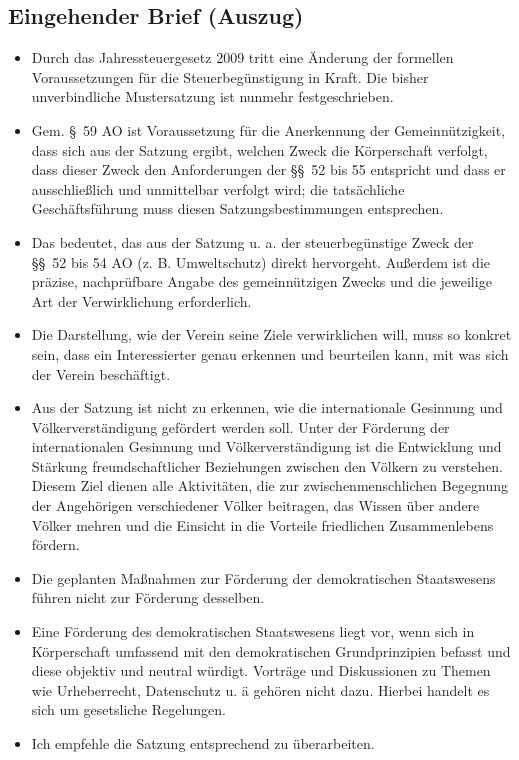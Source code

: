 \documentclass[10pt,a4paper]{scrartcl}
\newcommand{\qs}[1]{\glqq#1\grqq}
\begin{document}
\subsection*{Eingehender Brief (Auszug)}
    \begin{itemize}
        \item \qs{	Durch das Jahressteuergesetz 2009 tritt eine {\"A}nderung der formellen
					Voraussetzungen f{\"u}r die Steuerbeg{\"u}nstigung in Kraft. Die bisher
					unverbindliche Mustersatzung ist nunmehr festgeschrieben.}
		\item \qs{	Gem. \S\ 59 AO ist Voraussetzung f{\"u}r die Anerkennung der Gemeinn{\"u}tzigkeit,
					dass sich aus der Satzung ergibt, welchen Zweck die K{\"o}rperschaft
					verfolgt, dass dieser Zweck den Anforderungen der \S\S\ 52 bis 55
					entspricht und dass er ausschlie{\ss}lich und unmittelbar verfolgt wird; die
					tats{\"a}chliche Gesch{\"a}ftsf{\"u}hrung muss diesen Satzungsbestimmungen
					entsprechen.}
		\item \qs{	Das bedeutet, das aus der Satzung u. a. der steuerbeg{\"u}nstige Zweck der
					\S\S\ 52 bis 54 AO (z. B. Umweltschutz) direkt hervorgeht. Au{\ss}erdem ist die
					pr{\"a}zise, nachpr{\"u}fbare Angabe des gemeinn{\"u}tzigen Zwecks und die jeweilige
					Art der Verwirklichung erforderlich.}
		\item \qs{	Die Darstellung, wie der Verein seine Ziele verwirklichen will, muss so
					konkret sein, dass ein Interessierter genau erkennen und beurteilen
					kann, mit was sich der Verein besch{\"a}ftigt.}
		\item \qs{	Aus der Satzung ist nicht zu erkennen, wie die internationale Gesinnung
					und V{\"o}lkerverst{\"a}ndigung gef{\"o}rdert werden soll.
					Unter der F{\"o}rderung der internationalen Gesinnung und
					V{\"o}lkerverst{\"a}ndigung ist die Entwicklung und St{\"a}rkung freundschaftlicher
					Beziehungen zwischen den V{\"o}lkern zu verstehen. Diesem Ziel dienen alle
					Aktivit{\"a}ten, die zur zwischenmenschlichen Begegnung der Angeh{\"o}rigen
					verschiedener V{\"o}lker beitragen, das Wissen {\"u}ber andere V{\"o}lker mehren und
					die Einsicht in die Vorteile friedlichen Zusammenlebens f{\"o}rdern.}
		\item \qs{	Die geplanten Ma{\ss}nahmen zur F{\"o}rderung der demokratischen Staatswesens
					f{\"u}hren nicht zur F{\"o}rderung desselben.}
		\item \qs{	Eine F{\"o}rderung des demokratischen Staatswesens liegt vor, wenn sich in
					K{\"o}rperschaft umfassend mit den demokratischen Grundprinzipien befasst
					und diese objektiv und neutral w{\"u}rdigt. Vortr{\"a}ge und Diskussionen zu
					Themen wie Urheberrecht, Datenschutz u. {\"a}
					geh{\"o}ren nicht dazu. Hierbei handelt es sich um gesetsliche Regelungen.}
		\item \qs{	Ich empfehle die Satzung entsprechend zu {\"u}berarbeiten.}
	\end{itemize}
\end{document}
